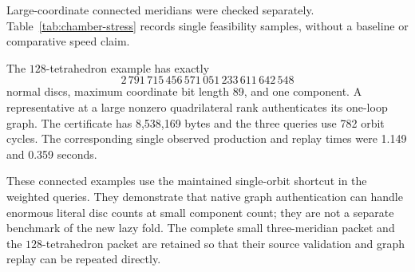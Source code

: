 Large-coordinate connected meridians were checked separately.
Table~\ref{tab:chamber-stress} records single feasibility samples, without
a baseline or comparative speed claim.

\begin{table}[htbp]
\centering\small
\setlength{\tabcolsep}{4pt}

\caption{Connected meridians of Fibonacci layered solid tori.
Proof size is compact uncompressed JSON bytes. Each graph consists of
one vertex and one loop.}
\label{tab:chamber-stress}
\end{table}

The \(128\)-tetrahedron example has exactly
\[
2\,791\,715\,456\,571\,051\,233\,611\,642\,548
\]
normal discs, maximum coordinate bit length 89, and one component. A
representative at a large nonzero quadrilateral rank authenticates its
one-loop graph. The certificate has 8,538,169 bytes and the three queries
use 782 orbit cycles. The corresponding single observed production and
replay times were 1.149 and 0.359 seconds.

These connected examples use the maintained single-orbit shortcut in the
weighted queries. They demonstrate that native graph authentication can
handle enormous literal disc counts at small component count; they are
not a separate benchmark of the new lazy fold. The complete small
three-meridian packet and the \(128\)-tetrahedron packet are retained so
that their source validation and graph replay can be repeated directly.

